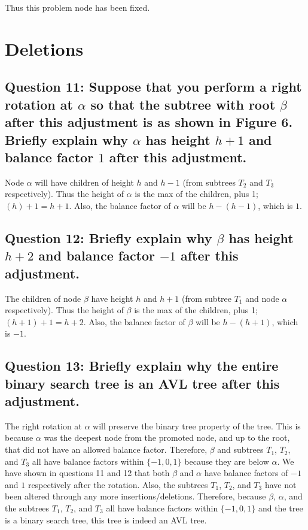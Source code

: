\documentclass[a4paper, 12pt, titlepage]{article}
\begin{document}
Thus this problem node has been fixed.

\section*{Deletions}

\subsection*{Question 11: Suppose that you perform a right rotation at $\alpha$ so that the subtree with root $\beta$ after this adjustment is as shown in Figure 6. Briefly explain why $\alpha$ has height $h+1$ and balance factor $1$ after this adjustment.} 

Node $\alpha$ will have children of height $h$ and $h-1$
(from subtrees $T_2$ and $T_3$ respectively).
Thus the height of $\alpha$ is the max of the children,
plus 1; $(h)+1=h+1$.
Also,
the balance factor of $\alpha$ will be $h - (h - 1)$,
which is $1$.

\subsection*{Question 12: Briefly explain why $\beta$ has height $h+2$ and balance factor $-1$ after this adjustment.} 

The children of node $\beta$ have height $h$ and $h+1$
(from subtree $T_1$ and node $\alpha$ respectively).
Thus the height of $\beta$ is the max of the children,
plus 1;
$(h+1)+1 = h+2$.
Also,
the balance factor of $\beta$ will be $h - (h + 1)$,
which is $-1$.

\subsection*{Question 13: Briefly explain why the entire binary search tree is an AVL tree after this adjustment.} 

The right rotation at $\alpha$ will preserve the binary tree property of the tree.
This is because $\alpha$ was the deepest node from the promoted node,
and up to the root,
that did not have an allowed balance factor.
Therefore, $\beta$ and subtrees
$T_1$,
$T_2$,
and $T_3$ all have balance factors within $\{-1, 0, 1\}$ because they are below $\alpha$.
We have shown in questions 11 and 12 that both $\beta$ and $\alpha$ have balance factors of $-1$ and $1$ respectively after the rotation.
Also,
the subtrees $T_1$,
$T_2$,
and $T_3$ have not been altered through any more insertions/deletions.
Therefore,
because $\beta$,
$\alpha$,
and the subtrees $T_1$,
$T_2$,
and $T_3$ all have balance factors within $\{-1, 0, 1\}$ and the tree is a binary search tree,
this tree is indeed an AVL tree.
\end{document}
